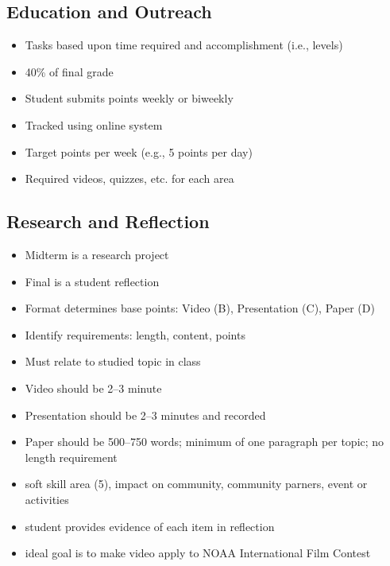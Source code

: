 \documentclass[letterpaper,10pt]{memoir}
\begin{document}
\subsection*{Education and Outreach}

\begin{itemize}[label=$-$,nosep]
\item Tasks based upon time required and accomplishment (i.e., levels)
\item 40\% of final grade
\item Student submits points weekly or biweekly
\item Tracked using online system
\item Target points per week (e.g., 5 points per day)
\item Required videos, quizzes, etc. for each area
\end{itemize}


\subsection*{Research and Reflection}

\begin{itemize}[label=$-$,nosep]
\item Midterm is a research project
\item Final is a student reflection
\item Format determines base points: Video (B), Presentation (C), Paper (D)
\item Identify requirements: length, content, points
\item Must relate to studied topic in class
\item Video should be 2--3 minute
\item Presentation should be 2--3 minutes and recorded
\item Paper should be 500--750 words; minimum of one paragraph per topic; no length requirement
\item soft skill area (5), impact on community, community parners, event or activities
\item student provides evidence of each item in reflection
\item ideal goal is to make video apply to NOAA International Film Contest
\end{itemize}



\end{document}
